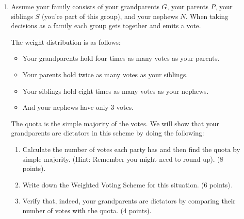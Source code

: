 \documentclass[12pt]{exam}
\begin{document}
\begin{enumerate}
\item Assume your family consists of your grandparents $G$, your parents $P$, your siblings $S$ (you're part of this group), and your nephews $N$. When taking decisions as a family each group gets together and emits a vote.\par
The weight distribution is as follows: 
\begin{itemize}
    \item Your grandparents hold four times as many votes as your parents.
    \item Your parents hold twice as many votes as your siblings.
    \item Your siblings hold eight times as many votes as your nephews.
    \item And your nephews have only 3 votes.
\end{itemize}
The quota is the simple majority of the votes. We will show that your grandparents are dictators in this scheme by doing the following:
\begin{enumerate}
    \item Calculate the number of votes each party has and then find the quota by simple majority. (Hint: Remember you might need to round up). (8 points).
    \item Write down the Weighted Voting Scheme for this situation. (6 points).
    \item Verify that, indeed, your grandparents are dictators by comparing their number of votes with the quota. (4 points).
\end{enumerate}




\end{enumerate}
\end{document}

